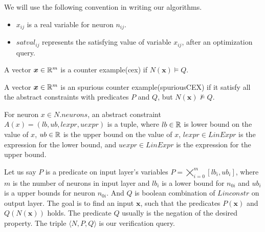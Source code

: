 

We will use the following convention in writing our algorithms.
\begin{itemize}
\item $x_{ij}$ is a real variable for neuron $n_{ij}$.
\item $satval_{ij}$ represents the satisfying value of variable $x_{ij}$, after an optimization query.
\end{itemize}


\begin{df}
  A vector $\boldsymbol{x} \in \mathbb{R}^m$ is a counter example(cex) if $N(\boldsymbol{x}) \models Q$.  
\end{df}

\begin{df}
  A vector $\boldsymbol{x} \in \mathbb{R}^m$ is an spurious counter example(spuriousCEX) if it satisfy all the abstract constraints
  with predicates $P$ and $Q$, but $N(\boldsymbol{x}) \nvDash Q$. 
\end{df}


\begin{df}
  For neuron $x \in N.neurons$,
  an abstract constraint $A(x) = (lb,ub, lexpr, uexpr)$ is a tuple, where
  $lb \in \mathbb{R}$ is lower bound on the value of $x$,
  $ub \in \mathbb{R}$ is the upper bound on the value of  $x$,
  $lexpr \in LinExpr$ is the expression for the lower bound, and
  $uexpr \in LinExpr$ is the expression for the upper bound.
\end{df}

Let us say $P$ is a predicate on input layer's variables $P = \bigtimes_{i=0}^{m}[lb_i, ub_i]$, where $m$ is 
the number of neurons in input layer and $lb_i$ is a lower bound for $n_{0i}$ and $ub_i$ is a upper bounds
for neuron $n_{0i}$.
And $Q$ is boolean combination of $Linconstr$ on output layer. 
The goal is to find an input $\boldsymbol{x}$, such that the predicates $P(\boldsymbol{x})$ and 
$Q(N(\boldsymbol{x}))$ holds. The predicate $Q$ usually is the negation of the desired property. 
The triple $\langle N, P, Q \rangle$ is our verification query. 






